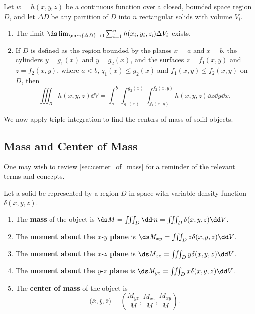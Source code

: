 \begin{theorem}\label{thm:triple_integration2}
Let $w=h(x,y,z)$ be a continuous function over a closed, bounded space region $D$, and let $\Delta D$ be any partition of $D$ into $n$ rectangular solids with volume $V_i$.

\begin{enumerate}
\item		The limit $\ds \lim_{\norm{\Delta D}\to 0}\sum_{i=1}^n h(x_i,y_i,z_i)\Delta V_i$ exists.

\item		If $D$ is defined as the region bounded by the planes $x=a$ and $x=b$, the cylinders $y=g_1(x)$ and $y=g_2(x)$, and the surfaces $z=f_1(x,y)$ and $z=f_2(x,y)$, where $a<b$, $g_1(x)\leq g_2(x)$ and $f_1(x,y)\leq f_2(x,y)$ on $D$, then
	\[\iiint_D h(x,y,z)\dd V = \int_a^b\int_{g_1(x)}^{g_2(x)}\int_{f_1(x,y)}^{f_2(x,y)} h(x,y,z)\dd z\dd y\dd x.\]
\end{enumerate}
\end{theorem}

We now apply triple integration to find the centers of mass of solid objects.

\subsection{Mass and Center of Mass}

One may wish to review \autoref{sec:center_of_mass} for a reminder of the relevant terms and concepts. 

\begin{definition}\label{def:mass_3d}
Let a solid be represented by a region $D$ in space with variable density function $\delta(x,y,z)$. 
\begin{enumerate}
	\item The \textbf{mass} of the object is $\ds M= \iiint_D \dd m=\iiint_D \delta(x,y,z)\dd V$.
	\item	The \textbf{moment about the $x$-$y$ plane} is $\ds M_{xy}=\iiint_D z\delta(x,y,z)\dd V$.
	\item	The \textbf{moment about the $x$-$z$ plane} is $\ds M_{xz}=\iiint_D y\delta(x,y,z)\dd V$.
	\item	The \textbf{moment about the $y$-$z$ plane} is $\ds M_{yz}=\iiint_D x\delta(x,y,z)\dd V$.
	\item The \textbf{center of mass} of the object is
	\[\bigl(\overline{x},\overline{y},\overline{z}\bigr) = \left(\frac{M_{yz}}M,\frac{M_{xz}}M,\frac{M_{xy}}M\right).\]
\end{enumerate}
\end{definition}

